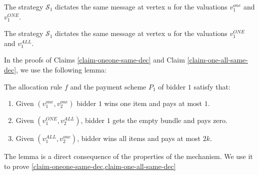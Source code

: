  \begin{comment}
 Let $u$ be the first vertex in the protocol such that the behavior profiles $(\mathcal{S}_1(v_1),\mathcal{S}_2(v_2))$ and $(\mathcal{S}_1(v_1'),\mathcal{S}_2(v_2'))$ dictate different messages. 
Note that by definition $u\in Path(\mathcal{S}_1(v_1),\mathcal{S}_2(v_2))\cap Path(\mathcal{S}_1(v_1'),\mathcal{S}_2(v_2'))$. We remind that each vertex is associated with only one player that sends messages in it. 
We assume without loss of generality that player $1$ is the player that sends a message in vertex $u$, so  there exist $v_1,v_1'\in \mathcal{V}_1$ such that $\mathcal S_1(v_1)$ and $\mathcal S_1(v_1')$ dictate different messages at vertex $u$. We remind that $\mathcal{V}_1=\{v_1^{one},v_1^{ONE},v_1^{all}\}$, so 
the  following claims jointly imply a contradiction, completing the proof of Theorem \ref{thm-lb-mua-dec}:
\end{comment}
\begin{claim}\label{claim-oneone-same-dec}
    The strategy $\mathcal S_1$ dictates the same message at vertex $u$ for the valuations $v_1^{one}$ and $v_1^{ONE}$. 
\end{claim}
\begin{claim}\label{claim-one-all-same-dec}
        The strategy $\mathcal S_1$ dictates the same message at vertex $u$ for the valuations $v_1^{ONE}$ and $v_1^{ALL}$.
\end{claim}
In the proofs of Claims \ref{claim-oneone-same-dec} and Claim \ref{claim-one-all-same-dec}, we use the following lemma:
\begin{lemma}\label{lemma-small-pay-dec}
    The allocation rule $f$ and the payment scheme $P_1$ of bidder $1$ satisfy that:
    \begin{enumerate}
        \item Given $(v_1^{one},v_{2}^{one})$ bidder $1$ wins  one item and pays at most $1$.  \label{item-1-dec}
        \item  Given $(v_1^{ONE},v_2^{ALL})$, bidder $1$ gets the empty bundle and pays zero.   \label{item-2-dec}
        \item Given $(v_1^{ALL},v_2^{one})$, bidder wins all items and pays at most $2k$. \label{item-3-dec}  
    \end{enumerate}
\end{lemma}
The lemma is a direct consequence of the properties of the mechanism. 
We use 
it to prove \cref{claim-oneone-same-dec,claim-one-all-same-dec}
